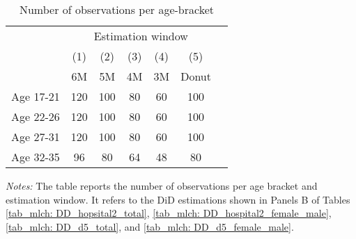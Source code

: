 \vspace*{\fill}
\begin{table}[H] \centering 
	\begin{threeparttable} \centering \caption{Number of observations per age-bracket}\label{tab_mlch: observations_age_brackets}
		{\def\sym#1{\ifmmode^{#1}\else\(^{#1}\)\fi} 
			\begin{tabular}{l*{6}{c}}
				\toprule  
				& \multicolumn{5}{c}{Estimation window} \\ 
				\cmidrule(lr){2-6}
				&\multicolumn{1}{c}{(1)}&\multicolumn{1}{c}{(2)}&\multicolumn{1}{c}{(3)}&\multicolumn{1}{c}{(4)}&\multicolumn{1}{c}{(5)}\\
				&\multicolumn{1}{c}{6M}&\multicolumn{1}{c}{5M}&\multicolumn{1}{c}{4M}&\multicolumn{1}{c}{3M}&\multicolumn{1}{c}{Donut}\\
				\midrule
				Age 17-21	&	120		&	100		&	80	&   60	&  100  \\  
				Age 22-26	&	120		&	100		&	80	&   60	&  100  \\  
				Age 27-31	&	120		&	100		&	80	&   60	&  100  \\  
				Age 32-35	&	 96		&	 80		&	64	&   48	&   80  \\
				\bottomrule 
		\end{tabular}}
		\begin{tablenotes} 
			\item \scriptsize \emph{Notes:} The table reports the number of observations per age bracket and estimation window. It refers to the DiD estimations shown in Panels B of Tables \ref{tab_mlch: DD_hopsital2_total}, \ref{tab_mlch: DD_hospital2_female_male}, \ref{tab_mlch: DD_d5_total}, and \ref{tab_mlch: DD_d5_female_male}.
		\end{tablenotes} 
	\end{threeparttable} 
\end{table}
\vspace*{\fill}\clearpage 



